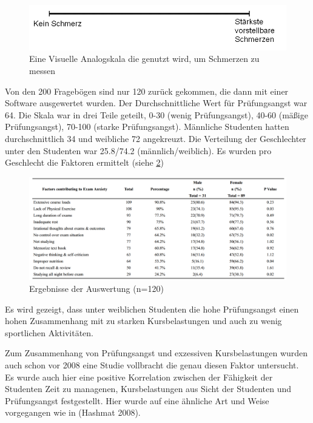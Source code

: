 \documentclass[11pt, a4paper]{article}
\begin{document}
	\begin{figure}[p]
		\centering
		\includegraphics{img/VAS.png}
		\caption{Eine Visuelle Analogskala die genutzt wird, um Schmerzen zu messen \cite{hashmat2008factors}}
		\label{fig:vas}
	\end{figure}

	Von den 200 Fragebögen sind nur 120 zurück gekommen, die dann mit einer Software ausgewertet wurden. Der Durchschnittliche Wert für Prüfungsangst war 64. Die Skala war in drei Teile geteilt, 0-30 (wenig Prüfungsangst), 40-60 (mäßige Prüfungsangst), 70-100 (starke Prüfungsangst). Männliche Studenten hatten durchschnittlich 34 und weibliche 72 angekreuzt. Die Verteilung der Geschlechter unter den Studenten war 25.8/74.2 (männlich/weiblich). Es wurden pro Geschlecht die Faktoren ermittelt (siehe \cref{fig:jpmatable}) \cite{hashmat2008factors}

	\begin{figure}[p]
		\centering
		\includegraphics[scale=0.5]{img/jpma_table.png}
		\caption{Ergebnisse der Auswertung (n=120) \cite{hashmat2008factors}}
		\label{fig:jpmatable}
	\end{figure}

	Es wird gezeigt, dass unter weiblichen Studenten die hohe Prüfungsangst einen hohen Zusammenhang mit zu starken Kursbelastungen und auch zu wenig sportlichen Aktivitäten. \cite{hashmat2008factors}

	Zum Zusammenhang von Prüfungsangst und exzessiven Kursbelastungen wurden auch schon vor 2008 eine Studie vollbracht die genau diesen Faktor untersucht. Es wurde auch hier eine positive Korrelation zwischen der Fähigkeit der Studenten Zeit zu managenen,  Kursbelastungen aus Sicht der Studenten und Prüfungsangst festgestellt. Hier wurde auf eine ähnliche Art und Weise vorgegangen wie in (Hashmat 2008). \cite{sansgiry2006effect}
\end{document}
